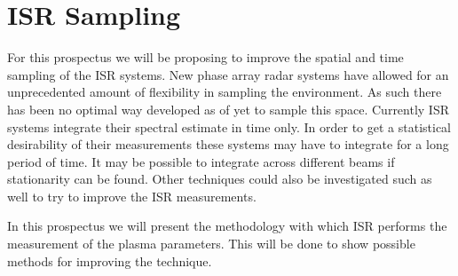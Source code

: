 \section{ISR Sampling}
For this prospectus we will be proposing to improve the spatial and time sampling of the ISR systems.  New phase array radar systems have allowed for an unprecedented amount of flexibility in sampling the environment.  As such there has been no optimal way developed as of yet to sample this space.  Currently ISR systems integrate their spectral estimate in time only.  In order to get a statistical desirability of their measurements these systems may have to integrate for a long period of time.  It may be possible to integrate across different beams if stationarity can be found.  Other techniques could also be investigated such as well to try to improve the ISR measurements.

In this prospectus we will present the methodology with which ISR performs the measurement of the plasma parameters.  This will be done to show possible methods for improving the technique.